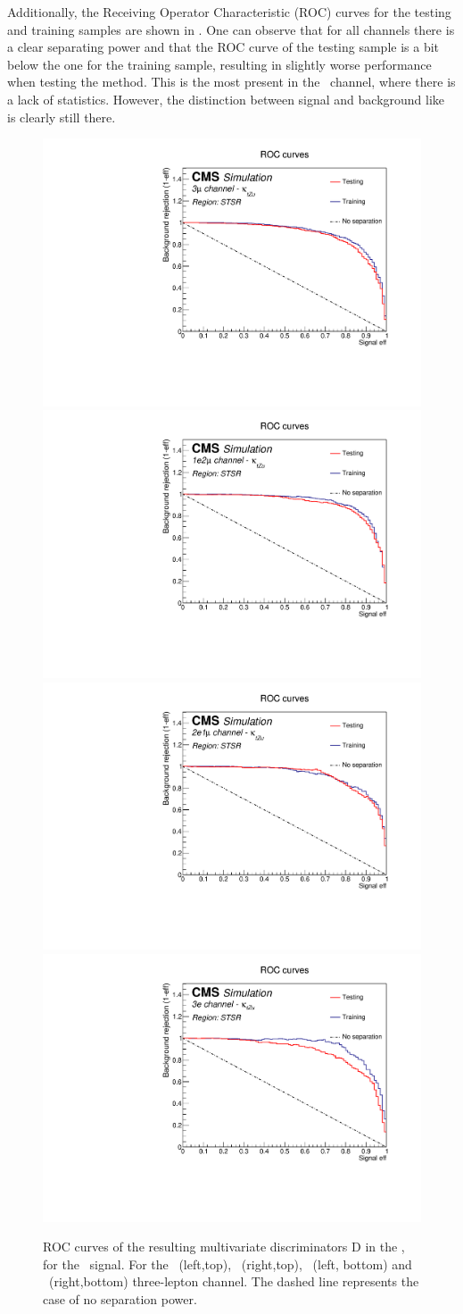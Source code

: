Additionally, the Receiving Operator Characteristic (ROC) curves for the testing and training samples are shown in . One can observe that for all channels there is a clear separating power and that the ROC curve of the testing sample is a bit below the one for the training sample, resulting in slightly worse performance when testing the method. This is the most present in the \eee\ channel, where there is a lack of statistics. However, the distinction between signal and background like is clearly still there.
\begin{figure}[htbp]
	\centering
	\includegraphics[width=0.49\linewidth]{6_Search/Figures/PlotsTechnics/ROCZutsingletopuuu}
	\includegraphics[width=0.49\linewidth]{6_Search/Figures/PlotsTechnics/ROCZutsingletopuue}
	\includegraphics[width=0.49\linewidth]{6_Search/Figures/PlotsTechnics/ROCZutsingletopeeu}
	\includegraphics[width=0.49\linewidth]{6_Search/Figures/PlotsTechnics/ROCZutsingletopeee}
	\caption{ROC curves of the resulting  multivariate discriminators D in the \STSR, for the \Zut\ signal. For the \mumumu\ (left,top), \emumu\ (right,top), \eemu\ (left, bottom) and \eee\ (right,bottom) three-lepton channel. The dashed line represents the case of no separation power.}
	\label{fig:roczutsingletop}
\end{figure}




